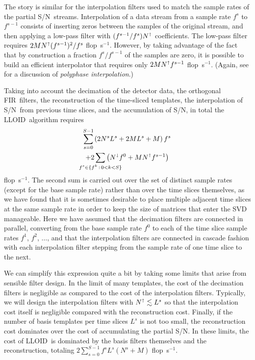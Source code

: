 \documentclass[preprint2]{aastex}
\newcommand{\SNR}{S/N}%
\newcommand{\numtmps}{\ensuremath{M}}
\newcommand{\svdtmps}[1]{\ensuremath{L^#1}}
\newcommand{\numsvdtmps}{\svdtmps{s}}
\newcommand{\slicesamps}[1]{\ensuremath{N^#1}}
\newcommand{\slicessamps}{\slicesamps{s}}
\newcommand{\fir}{FIR}%
\newcommand{\flops}{flop~s$^{-1}$}
\newcommand{\lloid}{LLOID}%
\def\clap#1{\hbox to 0pt{\hss#1\hss}}
\def\mathclap{\mathpalette\mathclapinternal}
\def\mathclapinternal#1#2{\clap{$\mathsurround=0pt#1{#2}$}}
\begin{document}
The story is similar for the interpolation filters used to match the sample
rates of the partial \SNR\ streams.  Interpolation of a data stream from a
sample rate $f^s$ to $f^{s-1}$ consists of inserting zeros between the samples
of the original stream, and then applying a low-pass filter with
$(f^{s-1} / f^s) N^\shortuparrow$ coefficients.  The low-pass filter requires
$2 M N^\shortuparrow (f^{s-1})^2 / f^s$ \flops.  However, by taking advantage
of the fact that by construction a fraction $f^s / f^{s-1}$ of the samples are
zero, it is possible to build an efficient interpolator that requires only
$2 M N^\shortuparrow f^{s-1}$ \flops.  (Again, see \citet{jovanovic2002multirate} for a discussion of \emph{polyphase interpolation}.)

Taking into account the decimation of the detector data, the orthogonal \fir\
filters, the reconstruction of the time-sliced templates, the interpolation of
\SNR\ from previous time slices, and the accumulation of \SNR, in total the
\lloid\ algorithm requires
%
\begin{multline}
\label{eq:lloid-flops}
\sum_{\mathclap{s=0}}^{\mathclap{S-1}} \left( 2 \slicessamps \numsvdtmps + 2 \numtmps \numsvdtmps + \numtmps \right) f^s \\ + 2\sum_{\mathclap{f^s \in \{f^k \, : \, 0 < k < S\}}} \left( N^\shortdownarrow f^0 + \numtmps N^\shortuparrow f^{s-1}\right)
\end{multline}
%
\flops.  The second sum is carried out over the set of distinct sample rates
(except for the base sample rate) rather than over the time slices themselves,
as we have found that it is sometimes desirable to place multiple adjacent time
slices at the same sample rate in order to keep the size of matrices that enter
the SVD manageable.  Here we have assumed that the
decimation filters are connected in parallel, converting from the base sample
rate $f^0$ to each of the time slice sample rates $f^1$, $f^2$, $\dots$, and
that the interpolation filters are connected in cascade fashion with each
interpolation filter stepping from the sample rate of one time slice to the
next.

We can simplify this expression quite a bit by taking some limits that arise
from sensible filter design.  In the limit of many templates, the cost of the
decimation filters is negligible as compared to the cost of the interpolation
filters.  Typically, we will design the interpolation filters with
$N^\shortuparrow \lesssim \numsvdtmps$ so that the interpolation cost itself is
negligible compared with the reconstruction cost.  Finally, if the number of
basis templates per time slices $\numsvdtmps$ is not too small, the
reconstruction cost dominates over the cost of accumulating the partial \SNR.
In these limits, the cost of \lloid\ is dominated by the basis filters
themselves and the reconstruction, totaling
$2 \sum_{s=0}^{S-1} f^s \numsvdtmps \left( \slicessamps + \numtmps \right)$ \flops.
\end{document}
